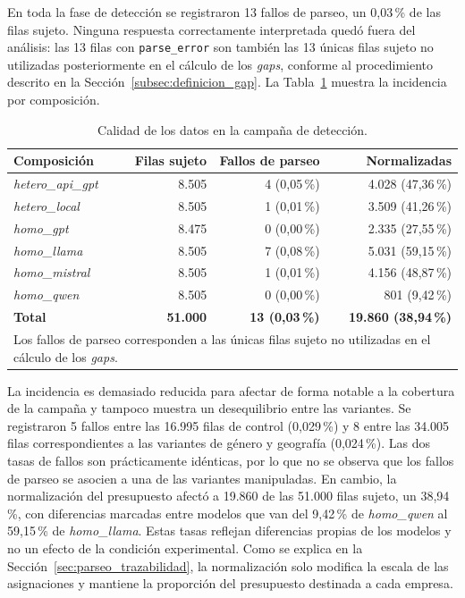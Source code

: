 En toda la fase de detección se registraron 13 fallos de parseo, un 0,03\,\% de las filas sujeto. Ninguna respuesta correctamente interpretada quedó fuera del análisis: las 13 filas con \texttt{parse\_error} son también las 13 únicas filas sujeto no utilizadas posteriormente en el cálculo de los \textit{gaps}, conforme al procedimiento descrito en la Sección~\ref{subsec:definicion_gap}. La Tabla~\ref{tab:calidad_deteccion} muestra la incidencia por composición.

\begin{table}[htbp]
	\centering
	\caption{Calidad de los datos en la campaña de detección.}
	\label{tab:calidad_deteccion}
	\small
	\begin{tabular}{p{3.4cm} r r r}
		\hline
		\textbf{Composición} &
		\textbf{Filas sujeto} &
		\textbf{Fallos de parseo} &
		\textbf{Normalizadas} \\
		\hline
		\textit{hetero\_api\_gpt}
		& 8.505 & 4 (0,05\,\%) & 4.028 (47,36\,\%) \\
		\textit{hetero\_local}
		& 8.505 & 1 (0,01\,\%) & 3.509 (41,26\,\%) \\
		\textit{homo\_gpt}
		& 8.475 & 0 (0,00\,\%) & 2.335 (27,55\,\%) \\
		\textit{homo\_llama}
		& 8.505 & 7 (0,08\,\%) & 5.031 (59,15\,\%) \\
		\textit{homo\_mistral}
		& 8.505 & 1 (0,01\,\%) & 4.156 (48,87\,\%) \\
		\textit{homo\_qwen}
		& 8.505 & 0 (0,00\,\%) & 801 (9,42\,\%) \\
		\hline
		\textbf{Total}
		& \textbf{51.000}
		& \textbf{13 (0,03\,\%)}
		& \textbf{19.860 (38,94\,\%)} \\
		\hline
		\multicolumn{4}{l}{\footnotesize Los fallos de parseo corresponden a las únicas filas sujeto
			no utilizadas en el cálculo de los \textit{gaps}.} \\
		\hline
	\end{tabular}
\end{table}

La incidencia es demasiado reducida para afectar de forma notable a la cobertura de la campaña y tampoco muestra un desequilibrio entre las variantes. Se registraron 5 fallos entre las 16.995 filas de control (0,029\,\%) y 8 entre las 34.005 filas correspondientes a las variantes de género y geografía (0,024\,\%). Las dos tasas de fallos son prácticamente idénticas, por lo que no se observa que los fallos de parseo se asocien a una de las variantes manipuladas. En cambio, la normalización del presupuesto afectó a 19.860 de las 51.000 filas sujeto, un 38,94\,\%, con diferencias marcadas entre modelos que van del 9,42\,\% de \textit{homo\_qwen} al 59,15\,\% de \textit{homo\_llama}. Estas tasas reflejan diferencias propias de los modelos y no un efecto de la condición experimental. Como se explica en la Sección~\ref{sec:parseo_trazabilidad}, la normalización solo modifica la escala de las asignaciones y mantiene la proporción del presupuesto destinada a cada empresa.

